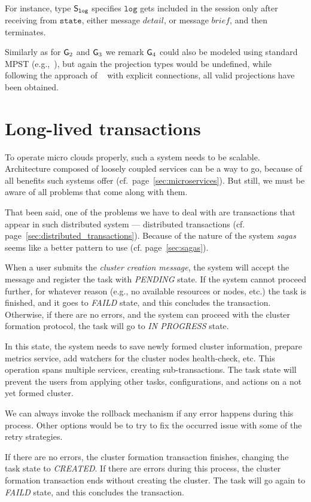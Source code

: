 \noindent
For instance, type ${\mathsf S}_\mathtt{log}$ specifies $\mathtt{log}$ gets included in the session only after receiving from $\mathtt{state}$, either message $\mathit{detail}$, or message $\mathit{brief}$, and then terminates. 

Similarly as for ${\sf G}_2$ and ${\sf G}_3$ we remark ${\sf G}_4$ could also be modeled using standard MPST (e.g.,~\cite{HondaYC08}), but again the projection types would be undefined, while following the approach of ~\cite{HuY17} with explicit connections, all valid projections have been obtained.
%
%
\section{Long-lived transactions}\label{sec:long_live_transactions}
%
To operate micro clouds properly, such a system needs to be scalable. Architecture composed of loosely coupled services can be a way to go, because of all benefits such systems offer (cf.~page~\ref{sec:microservices}). But still, we must be aware of all problems that come along with them.

That been said, one of the problems we have to deal with are transactions that appear in such distributed system --- distributed transactions (cf. page~\ref{sec:distributed_transactions}). Because of the nature of the system \emph{sagas} seems like a better pattern to use (cf. page~\ref{sec:sagas}).

When a user submits the \emph{cluster creation message}, the system will accept the message and register the task with \emph{PENDING} state. If the system cannot proceed further, for whatever reason (e.g., no available resources or nodes, etc.) the task is finished, and it goes to \emph{FAILD} state, and this concludes the transaction. Otherwise, if there are no errors, and the system can proceed with the cluster formation protocol, the task will go to \emph{IN PROGRESS} state.

In this state, the system needs to save newly formed cluster information, prepare metrics service, add watchers for the cluster nodes health-check, etc. This operation spans multiple services, creating sub-transactions. The task state will prevent the users from applying other tasks, configurations, and actions on a not yet formed cluster.

We can always invoke the rollback mechanism if any error happens during this process. Other options would be to try to fix the occurred issue with some of the retry strategies.

If there are no errors, the cluster formation transaction finishes, changing the task state to \emph{CREATED}. If there are errors during this process, the cluster formation transaction ends without creating the cluster. The task will go again to \emph{FAILD} state, and this concludes the transaction.

